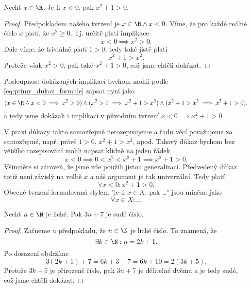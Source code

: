 \begin{proposition}
    Nechť $x\in\R$. Je-li $x<0$, pak $x^2+1>0$.
\end{proposition}
\begin{proof}
    Předpokladem našeho tvrzení je $x\in\R \land x<0$. Víme, že pro každé reálné číslo $x$ platí, že $x^2\geq 0$. Tj. určitě platí implikace
    \begin{equation*}
        x<0 \implies x^2>0.
    \end{equation*}
    Dále víme, že triviálně platí $1>0$, tedy také jistě platí
    \begin{equation*}
        x^2+1>x^2.
    \end{equation*}
    Protože však $x^2>0$, pak také
    $x^2+1>0$, což jsme chtěli dokázat.
\end{proof}
Posloupnost dokázaných implikací bychom mohli podle \eqref{eq:primy_dukaz_formule} zapsat nyní jako
\begin{equation*}
    (x\in\R \land x<0 \implies x^2>0) \land (x^2>0 \implies x^2+1>x^2) \land (x^2+1>x^2 \implies x^2+1>0),
\end{equation*}
a tedy jsme dokázali i implikaci v původním tvrzení $x<0 \implies x^2+1>0$.\par
V praxi důkazy takto samozřejmě nerozepisujeme a řadu věcí považujeme za samozřejmé, např. právě $1>0$, $x^2+1>x^2$, apod. Takový důkaz bychom bez většího rozepisování mohli napsat klidně na jeden řádek.
\begin{equation*}
    x<0 \implies 0<x^2<x^2+1 \implies x^2+1>0.
\end{equation*}
Všimněte si zároveň, že jsme zde použili jistou generalizaci. Předvedený důkaz totiž není závislý na volbě $x$ a náš argument je tak univerzální. Tedy platí
\begin{equation*}
    \forall x<0: x^2+1>0.
\end{equation*}
Obecně tvrzení formulovaná stylem "je-li $x\in X$, pak \dots" jsou míněna jako
\begin{equation*}
    \forall x\in X: \dots
\end{equation*}
\begin{proposition}
    Nechť $n\in\N$ je liché. Pak $3n+7$ je sudé číslo.
\end{proposition}
\begin{proof}
    Začneme u předpokladu, že $n\in\N$ je liché číslo. To znamená, že
    \begin{equation*}
        \exists k\in\N : n=2k+1.
    \end{equation*}
    Po dosazení obdržíme
    \begin{equation*}
        3(2k+1)+7=6k+3+7=6k+10=2(3k+5).
    \end{equation*}
    Protože $3k+5$ je přirozené číslo, pak $3n+7$ je dělitelné dvěma a je tedy sudé, což jsme chtěli dokázat.
\end{proof}
